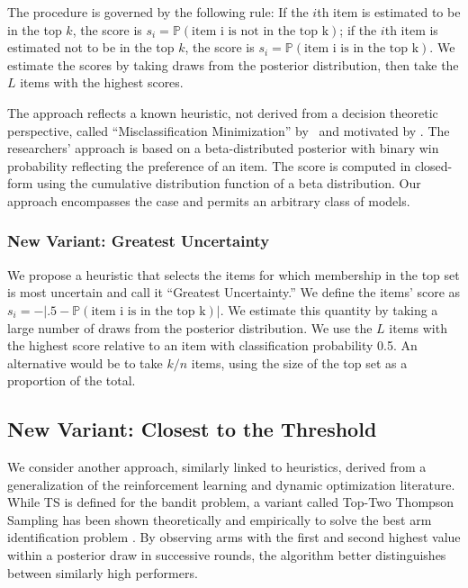 \documentclass[nonblindrev]{informs3}
\newcommand{\numitems}{n}
\newcommand{\numtopset}{k}
\newcommand{\numperset}{L}
\begin{document}
The procedure is governed by the following rule: If the $i$th item is estimated to be in the top $k$, the score is $s_i=\mathbb{P} (\text{item i is not in the top k})$; if the $i$th item is estimated not to be in the top $k$, the score is $s_i=\mathbb{P} (\text{item i is in the top k})$. We estimate the scores by taking draws from the posterior distribution, then take the $\numperset$ items with the highest scores.

The approach reflects a known heuristic, not derived from a decision theoretic perspective, called ``Misclassification Minimization'' by~\cite{toubia2007adaptive} and motivated by \cite{bradlow1998some}. The researchers' approach is based on a beta-distributed posterior with binary win probability reflecting the preference of an item. The score is computed in closed-form using the cumulative distribution function of a beta distribution. Our approach encompasses the case and permits an arbitrary class of models. 

\subsubsection{New Variant: Greatest Uncertainty}

We propose a heuristic that selects the items for which membership in the top set is most uncertain and call it ``Greatest Uncertainty.''  We define the items' score as $s_i=-|.5-\mathbb{P} (\text{item i is in the top k})|$. We estimate this quantity by taking a large number of draws from the posterior distribution. We use the $\numperset$ items with the highest score relative to an item with classification probability 0.5. An alternative would be to take $\numtopset/\numitems$ items, using the size of the top set as a proportion of the total. 

\subsection{New Variant: Closest to the Threshold}

We consider another approach, similarly linked to heuristics, derived from a generalization of the reinforcement learning and dynamic optimization literature. While TS is defined for the bandit problem, a variant called Top-Two Thompson Sampling has been shown theoretically and empirically to solve the best arm identification problem \citep{russo2016simple}. By observing arms with the first and second highest value within a posterior draw in successive rounds, the algorithm better distinguishes between similarly high performers.
\end{document}
